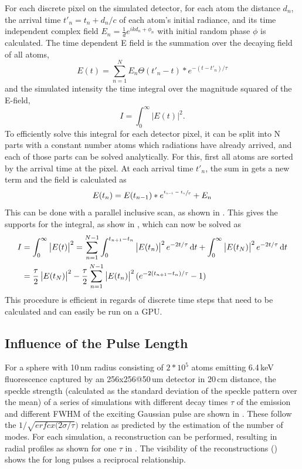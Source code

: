 For each discrete pixel on the simulated detector, for each atom the distance $d_n$, the arrival time $t'_n=t_n+d_n/c$ of each atom's initial radiance, and its time independent complex field $E_n=\frac{1}{d} e^{ikd_n+\phi_n}$ with initial random phase $\phi$ is calculated.
The time dependent E field is the summation over the decaying field of all atoms,
\begin{equation}
E(t)=\sum_{n=1}^N  E_n \Theta(t'_n  - t) * e^{-(t-t'_n )/\tau}
\label{eq:tdsum}
\end{equation}
and the simulated intensity the time integral over the magnitude squared of the E-field,
\begin{equation}
I=\int_0^\infty \left| E(t) \right|^2 .
\label{eq:tdint}
\end{equation}
To efficiently solve this integral for each detector pixel, it can be split into N parts with a constant number atoms which radiations have already arrived, and each of those parts can be solved analytically. For this, first all atoms are sorted by the arrival time at the pixel. At each arrival time $t'_n$, the sum in  gets a new term and the field is calculated as
\begin{equation}
E(t_n)=E(t_{n-1})*e^{\sfrac{t_{n-1}-t_n}{\tau}}+E_n
\end{equation}
 This can be done with a parallel inclusive scan, as shown in . This gives the supports for the integral, as show in , which can now be solved as
\begin{align}
	I&=\int_0^\infty \left| E(t) \right|^2 = \sum_{n=1}^{N-1} \int_0^{t_{n+1}-t_n} \left|E(t_n)\right|^2 e^{-2t/\tau} \dif t +\int_0^\infty \left| E(t_N)\right|^2 e^{-2t/\tau} \dif t \\
	 &=  \frac{\tau}{2}  \left|E(t_N)\right|^2 -  \frac{\tau}{2}\sum_{n=1}^{N-1} \left|E(t_n)\right|^2 (e^{-2 (t_{n+1}-t_n)/\tau} -1 ) 
\end{align}
This procedure is efficient in regards of discrete time steps that need to be calculated and can easily be run on a GPU.

\subsection{Influence of the Pulse Length}
For a sphere with 10\,nm radius consisting of $2*10^5$ atoms emitting 6.4\,keV fluorescence captured by an 256x256@50\,um detector in 20\,cm distance, the speckle strength (calculated as the standard deviation of the speckle pattern over the mean) of a series of simulations with different decay times $\tau$ of the emission and different FWHM of the exciting Gaussian pulse are shown in .  These follow the $1/\sqrt{erfcx(2\sigma/\tau})$ relation as predicted by the estimation of the number of modes.  For each simulation, a reconstruction can be performed, resulting in radial profiles as shown for one $\tau$ in . The visibility of the reconstructions () shows the for long pulses a reciprocal relationship.

